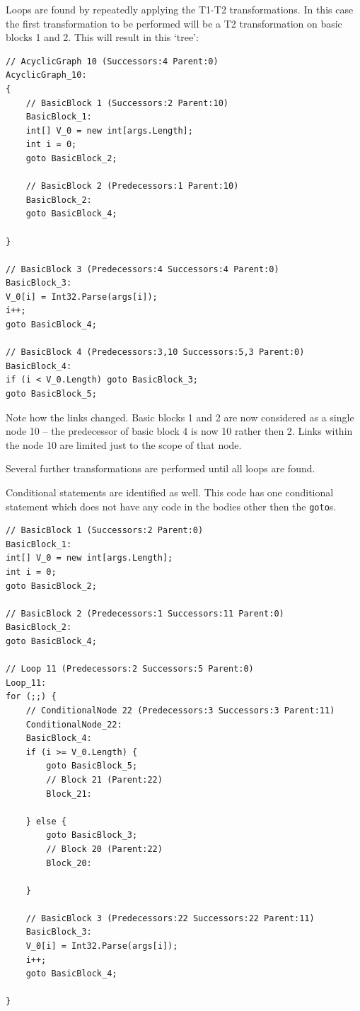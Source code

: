\documentclass[12pt,twoside,notitlepage]{report}
\begin{document}
Loops are found by repeatedly applying the T1-T2 transformations.
In this case the first transformation to be performed will be
a T2 transformation on basic blocks 1 and 2.
This will result in this `tree':

\begin{verbatim}
// AcyclicGraph 10 (Successors:4 Parent:0)
AcyclicGraph_10:
{
    // BasicBlock 1 (Successors:2 Parent:10)
    BasicBlock_1:
    int[] V_0 = new int[args.Length];
    int i = 0;
    goto BasicBlock_2;
    
    // BasicBlock 2 (Predecessors:1 Parent:10)
    BasicBlock_2:
    goto BasicBlock_4;
    
}

// BasicBlock 3 (Predecessors:4 Successors:4 Parent:0)
BasicBlock_3:
V_0[i] = Int32.Parse(args[i]);
i++;
goto BasicBlock_4;

// BasicBlock 4 (Predecessors:3,10 Successors:5,3 Parent:0)
BasicBlock_4:
if (i < V_0.Length) goto BasicBlock_3; 
goto BasicBlock_5;
\end{verbatim}

Note how the links changed.  Basic blocks 1 and 2 are now considered as a 
single node 10 -- the predecessor of basic block 4 is now 10 rather then 2.
Links within the node 10 are limited just to the scope of that node.

Several further transformations are performed until all loops are found.

Conditional statements are identified as well.  
This code has one conditional statement which 
does not have any code in the bodies other then the \verb|goto|s.

\newpage

\begin{verbatim}
// BasicBlock 1 (Successors:2 Parent:0)
BasicBlock_1:
int[] V_0 = new int[args.Length];
int i = 0;
goto BasicBlock_2;

// BasicBlock 2 (Predecessors:1 Successors:11 Parent:0)
BasicBlock_2:
goto BasicBlock_4;

// Loop 11 (Predecessors:2 Successors:5 Parent:0)
Loop_11:
for (;;) {
    // ConditionalNode 22 (Predecessors:3 Successors:3 Parent:11)
    ConditionalNode_22:
    BasicBlock_4:
    if (i >= V_0.Length) {
        goto BasicBlock_5;
        // Block 21 (Parent:22)
        Block_21:
    
    } else {
        goto BasicBlock_3;
        // Block 20 (Parent:22)
        Block_20:
    
    }
    
    // BasicBlock 3 (Predecessors:22 Successors:22 Parent:11)
    BasicBlock_3:
    V_0[i] = Int32.Parse(args[i]);
    i++;
    goto BasicBlock_4;
    
}
\end{verbatim}
\end{document}
